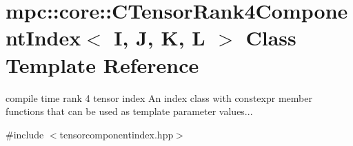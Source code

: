 \hypertarget{classmpc_1_1core_1_1_c_tensor_rank4_component_index}{}\section{mpc\+:\+:core\+:\+:C\+Tensor\+Rank4\+Component\+Index$<$ I, J, K, L $>$ Class Template Reference}
\label{classmpc_1_1core_1_1_c_tensor_rank4_component_index}


compile time rank 4 tensor index An index class with constexpr member functions that can be used as template parameter values...  




{\ttfamily \#include $<$tensorcomponentindex.\+hpp$>$}

